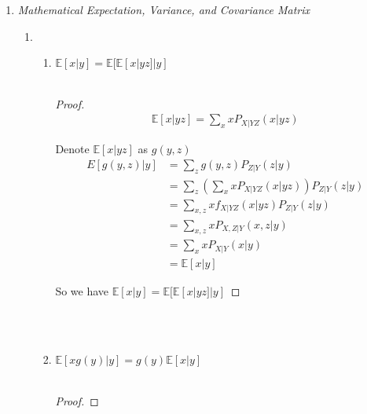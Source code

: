 \documentclass[a4paper]{article}
\begin{document}
\vspace{2em}


\begin{enumerate}
  \setlength{\itemsep}{3\parskip}

    \item \textit{Mathematical Expectation, Variance, and Covariance Matrix}
    \begin{enumerate}
      \item \begin{enumerate}
        \item $\mathbb{E}[x| y]=\mathbb{E}[\mathbb{E}[x | yz] |y]$
        \\~ 
        
        \begin{proof}
        \begin{equation}
          \begin{aligned}
            \mathbb{E} [x|yz] = \sum_{x} xP_{X|YZ}(x|yz)
          \end{aligned}
        \end{equation}

        Denote $ \mathbb{E} [x|yz]$ as $g(y,z)$
        \begin{equation}
          \begin{aligned}
            E[g(y,z) | y] &= \sum_{z} g(y,z) P_{Z|Y}(z|y) \\
            & = \sum_{z} \left(\sum_{x} xP_{X|YZ}(x|yz)\right)P_{Z|Y}(z|y) \\
            & = \sum_{x,z} xf_{X|YZ}(x|yz) P_{Z|Y}(z|y) \\
            & = \sum_{x,z} x P_{X,Z|Y}(x,z|y) \\
            & = \sum_{x} x P_{X|Y}(x|y) \\ 
            & = \mathbb{E}[x| y]
          \end{aligned}
        \end{equation}

        So we have $\mathbb{E}[x| y]=\mathbb{E}[\mathbb{E}[x | yz] |y]$
      \end{proof}
      ~\\~

      \item $\mathbb{E}[xg(y) |y] = g(y)\mathbb{E}[x| y]$
      \\~

      \begin{proof}
        

\end{proof}
\end{enumerate}
\end{enumerate}
\end{enumerate}
\end{document}
